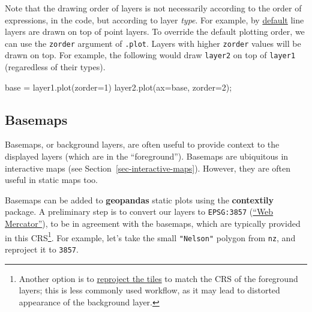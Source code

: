 \documentclass[
  letterpaper,
]{krantz}
\newenvironment{Shaded}{\begin{snugshade}}{\end{snugshade}}
\newcommand{\DecValTok}[1]{\textcolor[rgb]{0.68,0.00,0.00}{#1}}
\newcommand{\NormalTok}[1]{\textcolor[rgb]{0.00,0.23,0.31}{#1}}
\newcommand{\OperatorTok}[1]{\textcolor[rgb]{0.37,0.37,0.37}{#1}}
\begin{document}
\begin{tcolorbox}[enhanced jigsaw, title=\textcolor{quarto-callout-note-color}{\faInfo}\hspace{0.5em}{Note}, arc=.35mm, toprule=.15mm, titlerule=0mm, colframe=quarto-callout-note-color-frame, breakable, toptitle=1mm, bottomtitle=1mm, rightrule=.15mm, colbacktitle=quarto-callout-note-color!10!white, leftrule=.75mm, left=2mm, bottomrule=.15mm, opacityback=0, coltitle=black, opacitybacktitle=0.6, colback=white]

Note that the drawing order of layers is not necessarily according to
the order of expressions, in the code, but according to layer
\emph{type}. For example, by
\href{https://matplotlib.org/stable/gallery/misc/zorder_demo.html}{default}
line layers are drawn on top of point layers. To override the default
plotting order, we can use the \texttt{zorder} argument of
\texttt{.plot}. Layers with higher \texttt{zorder} values will be drawn
on top. For example, the following would draw \texttt{layer2} on top of
\texttt{layer1} (regaredless of their types).

\begin{Shaded}
\begin{Highlighting}[]
\NormalTok{base }\OperatorTok{=}\NormalTok{ layer1.plot(zorder}\OperatorTok{=}\DecValTok{1}\NormalTok{)}
\NormalTok{layer2.plot(ax}\OperatorTok{=}\NormalTok{base, zorder}\OperatorTok{=}\DecValTok{2}\NormalTok{)}\OperatorTok{;}
\end{Highlighting}
\end{Shaded}

\end{tcolorbox}

\subsection{Basemaps}\label{basemaps}

Basemaps, or background layers, are often useful to provide context to
the displayed layers (which are in the ``foreground''). Basemaps are
ubiquitous in interactive maps (see Section~\ref{sec-interactive-maps}).
However, they are often useful in static maps too.

Basemaps can be added to \textbf{geopandas} static plots using the
\textbf{contextily} package. A preliminary step is to convert our layers
to \texttt{EPSG:3857}
(\href{https://en.wikipedia.org/wiki/Web_Mercator_projection}{``Web
Mercator''}), to be in agreement with the basemaps, which are typically
provided in this CRS\footnote{Another option is to
  \href{https://contextily.readthedocs.io/en/latest/warping_guide.html}{reproject
  the tiles} to match the CRS of the foreground layers; this is less
  commonly used workflow, as it may lead to distorted appearance of the
  background layer.}. For example, let's take the small
\texttt{"Nelson"} polygon from \texttt{nz}, and reproject it to
\texttt{3857}.
\end{document}
